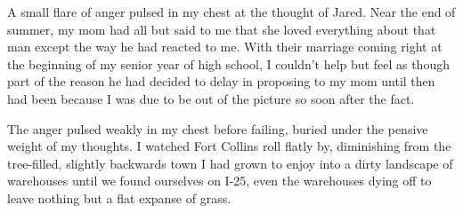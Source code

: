 A small flare of anger pulsed in my chest at the thought of Jared.  Near the end of summer, my mom had all but said to me that she loved everything about that man except the way he had reacted to me.  With their marriage coming right at the beginning of my senior year of high school, I couldn't help but feel as though part of the reason he had decided to delay in proposing to my mom until then had been because I was due to be out of the picture so soon after the fact.

The anger pulsed weakly in my chest before failing, buried under the pensive weight of my thoughts.  I watched Fort Collins roll flatly by, diminishing from the tree-filled, slightly backwards town I had grown to enjoy into a dirty landscape of warehouses until we found ourselves on I-25, even the warehouses dying off to leave nothing but a flat expanse of grass.
